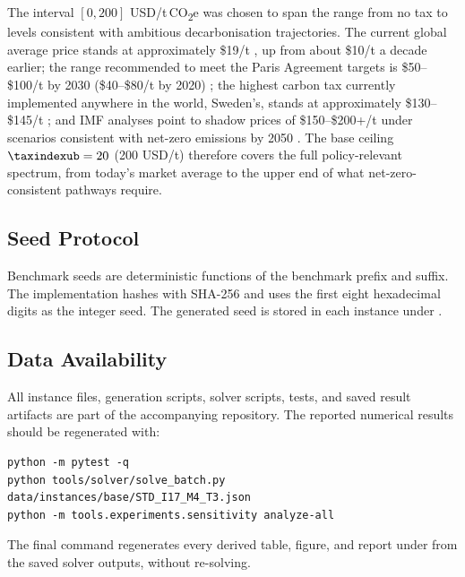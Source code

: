 The interval $[0,200]$ USD/t\,CO\textsubscript{2}e was chosen to span
the range from no tax to levels consistent with ambitious
decarbonisation trajectories. The current global average price stands
at approximately \$19/t \citep{worldbank2025}, up from about \$10/t a
decade earlier; the range recommended to meet the Paris Agreement
targets is \$50--\$100/t by 2030 (\$40--\$80/t by 2020)
\citep{stiglitzstern2017}; the highest carbon tax currently implemented
anywhere in the world, Sweden's, stands at approximately \$130--\$145/t
\citep{oecd2024sweden}; and IMF analyses point to shadow prices of
\$150--\$200+/t under scenarios consistent with net-zero emissions by
2050 \citep{imf2024netzero}. The base ceiling $\taxindexub=20$ (200 USD/t)
therefore covers the full policy-relevant spectrum, from today's market
average to the upper end of what net-zero-consistent pathways require.

\subsection{Seed Protocol}
\label{app:data:seeds}

Benchmark seeds are deterministic functions of the benchmark prefix
and suffix. The implementation hashes
 with SHA-256 and uses the first
eight hexadecimal digits as the integer seed. The generated seed is
stored in each instance under .

\subsection{Data Availability}
\label{app:data:availability}

All instance files, generation scripts, solver scripts, tests, and
saved result artifacts are part of the accompanying repository. The
reported numerical results should be regenerated with:
\begin{verbatim}
python -m pytest -q
python tools/solver/solve_batch.py data/instances/base/STD_I17_M4_T3.json
python -m tools.experiments.sensitivity analyze-all
\end{verbatim}
The final command regenerates every derived table, figure, and report under
 from the saved solver outputs, without re-solving.
